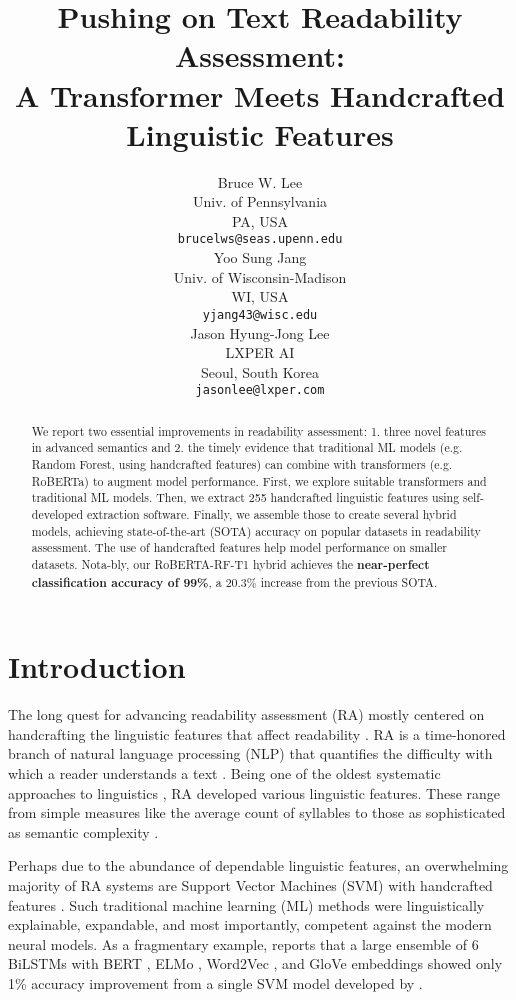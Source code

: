 \documentclass[11pt]{article}
\title{Pushing on Text Readability Assessment: \\A Transformer Meets Handcrafted Linguistic Features}
\author{Bruce W. Lee \\
  Univ. of Pennsylvania \\
  PA, USA \\
  \texttt{brucelws@seas.upenn.edu} \\\And
  Yoo Sung Jang \\
  Univ. of Wisconsin-Madison \\
  WI, USA \\
  \texttt{yjang43@wisc.edu} \\\And
  Jason Hyung-Jong Lee \\
  LXPER AI \\
  Seoul, South Korea \\
  \texttt{jasonlee@lxper.com} \\}
\begin{document}
{}
\maketitle{}{}
\begin{abstract}
We report two essential improvements in readability assessment: 1. three novel features in advanced semantics and 2. the timely evidence that traditional ML models (e.g. Random Forest, using handcrafted features) can combine with transformers (e.g. RoBERTa) to augment model performance. First, we explore suitable transformers and traditional ML models. Then, we extract 255 handcrafted linguistic features using self-developed extraction software. Finally, we assemble those to create several hybrid models, achieving state-of-the-art (SOTA) accuracy on popular datasets in readability assessment. The use of handcrafted features help model performance on smaller datasets. Nota-bly, our RoBERTA-RF-T1 hybrid achieves the \textbf{near-perfect classification accuracy of 99\%}, a 20.3\% increase from the previous SOTA.

\end{abstract}

\section{Introduction}
The long quest for advancing readability assessment (RA) mostly centered on handcrafting the linguistic features that affect readability \citep{Pitler:08}. RA is a time-honored branch of natural language processing (NLP) that quantifies the difficulty with which a reader understands a text \citep{Feng:10}. Being one of the oldest systematic approaches to linguistics \citep{Collins-Thompson:14}, RA developed various linguistic features. These range from simple measures like the average count of syllables to those as sophisticated as semantic complexity \citep{buchanan2001characterizing}.

Perhaps due to the abundance of dependable linguistic features, an overwhelming majority of RA systems are Support Vector Machines (SVM) with handcrafted features \citep{Hansen:21}. Such traditional machine learning (ML) methods were linguistically explainable, expandable, and most importantly, competent against the modern neural models. As a fragmentary example, \citet{Fili:19} reports that a large ensemble of 6 BiLSTMs with BERT \citep{bert}, ELMo \citep{elmo}, Word2Vec \citep{word2vec}, and GloVe \citep{glove} embeddings showed only 1\% accuracy improvement from a single SVM model developed by \citet{Xia:16}.
\end{document}
